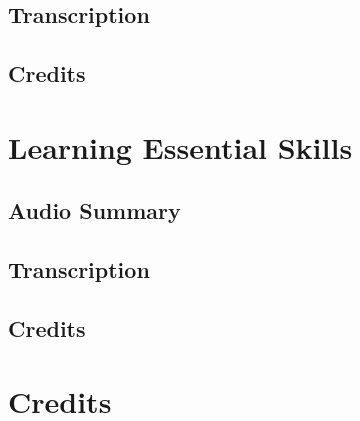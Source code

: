 \subsection{Transcription}

\subsection{Credits}

\section{Learning Essential Skills}

\subsection{Audio Summary}

\subsection{Transcription}

\subsection{Credits}

\section{Credits}